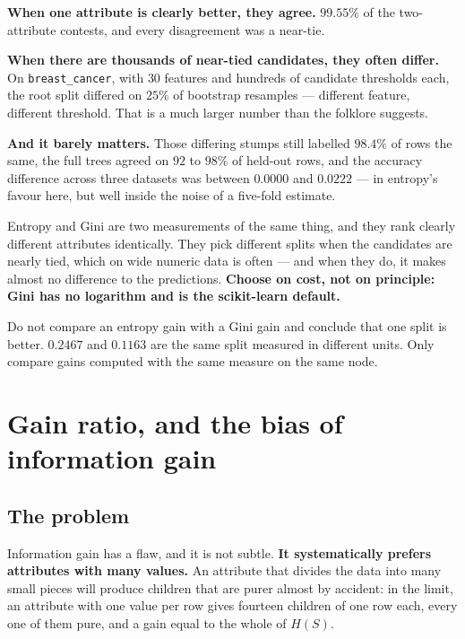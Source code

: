 \documentclass[11pt]{article}
\begin{document}
\textbf{When one attribute is clearly better, they agree.} $99.55\%$ of the
two-attribute contests, and every disagreement was a near-tie.

\textbf{When there are thousands of near-tied candidates, they often differ.}
On \texttt{breast\_cancer}, with $30$ features and hundreds of candidate
thresholds each, the root split differed on $25\%$ of bootstrap resamples ---
different feature, different threshold. That is a much larger number than the
folklore suggests.

\textbf{And it barely matters.} Those differing stumps still labelled $98.4\%$
of rows the same, the full trees agreed on $92$ to $98\%$ of held-out rows,
and the accuracy difference across three datasets was between $0.0000$ and
$0.0222$ --- in entropy's favour here, but well inside the noise of a
five-fold estimate.

\begin{keyidea}
Entropy and Gini are two measurements of the same thing, and they rank clearly
different attributes identically. They pick different splits when the
candidates are nearly tied, which on wide numeric data is often --- and when
they do, it makes almost no difference to the predictions. \textbf{Choose on
cost, not on principle: Gini has no logarithm and is the scikit-learn
default.}
\end{keyidea}

\begin{caution}
Do not compare an entropy gain with a Gini gain and conclude that one split is
better. $0.2467$ and $0.1163$ are the same split measured in different units.
Only compare gains computed with the same measure on the same node.
\end{caution}

\notesources{\AMLUnitVISources}

\section{Gain ratio, and the bias of information gain}
\label{sec:gainratio}

\subsection{The problem}

Information gain has a flaw, and it is not subtle. \textbf{It systematically
prefers attributes with many values.} An attribute that divides the data into
many small pieces will produce children that are purer almost by accident:
in the limit, an attribute with one value per row gives fourteen children of
one row each, every one of them pure, and a gain equal to the whole of $H(S)$.
\end{document}
